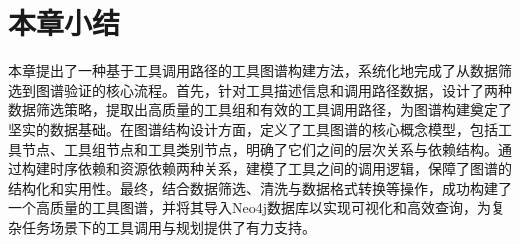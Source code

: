 \section{本章小结}

本章提出了一种基于工具调用路径的工具图谱构建方法，系统化地完成了从数据筛选到图谱验证的核心流程。首先，针对工具描述信息和调用路径数据，设计了两种数据筛选策略，提取出高质量的工具组和有效的工具调用路径，为图谱构建奠定了坚实的数据基础。在图谱结构设计方面，定义了工具图谱的核心概念模型，包括工具节点、工具组节点和工具类别节点，明确了它们之间的层次关系与依赖结构。通过构建时序依赖和资源依赖两种关系，建模了工具之间的调用逻辑，保障了图谱的结构化和实用性。最终，结合数据筛选、清洗与数据格式转换等操作，成功构建了一个高质量的工具图谱，并将其导入Neo4j数据库以实现可视化和高效查询，为复杂任务场景下的工具调用与规划提供了有力支持。

